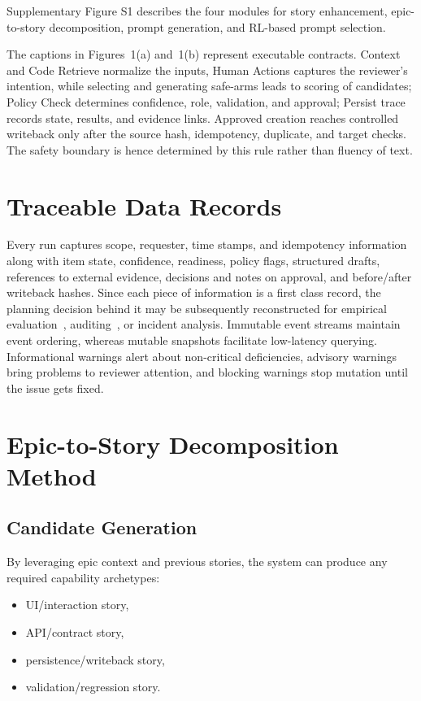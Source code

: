 \documentclass[10pt,a4paper]{article}
\begin{document}
Supplementary Figure S1 describes the four modules for story enhancement, epic-to-story decomposition, prompt generation, and RL-based prompt selection.

The captions in Figures~1(a) and~1(b) represent executable contracts. Context and Code Retrieve normalize the inputs, Human Actions captures the reviewer’s intention, while selecting and generating safe-arms leads to scoring of candidates; Policy Check determines confidence, role, validation, and approval; Persist trace records state, results, and evidence links. Approved creation reaches controlled writeback only after the source hash, idempotency, duplicate, and target checks. The safety boundary is hence determined by this rule rather than fluency of text.


\FloatBarrier
\section{Traceable Data Records}
Every run captures scope, requester, time stamps, and idempotency information along with item state, confidence, readiness, policy flags, structured drafts, references to external evidence, decisions and notes on approval, and before/after writeback hashes. Since each piece of information is a first class record, the planning decision behind it may be subsequently reconstructed for empirical evaluation~\citep{R70,R54}, auditing~\citep{R93}, or incident analysis. Immutable event streams maintain event ordering, whereas mutable snapshots facilitate low-latency querying. Informational warnings alert about non-critical deficiencies, advisory warnings bring problems to reviewer attention, and blocking warnings stop mutation until the issue gets fixed.


\FloatBarrier
\clearpage
\section{Epic-to-Story Decomposition Method}


\subsection{Candidate Generation}
By leveraging epic context and previous stories, the system can produce any required capability archetypes:
\begin{itemize}
  \item UI/interaction story,
  \item API/contract story,
  \item persistence/writeback story,
  \item validation/regression story.
\end{itemize}
\end{document}
